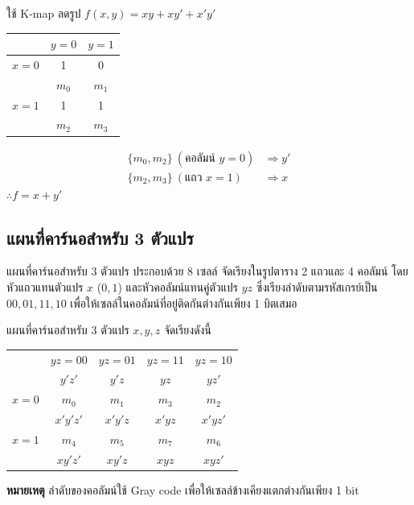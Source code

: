 \begin{ex}
\label{ex:kmap-2var-b}
ใช้ K-map ลดรูป $f(x, y) = x y + x y' + x' y'$

\begin{center}
\begin{tabular}{|c|c|c|}
\hline
 & $y = 0$ & $y = 1$ \\
\hline
$x = 0$ & 1 & 0 \\
       & $m_0$ & $m_1$ \\
\hline
$x = 1$ & 1 & 1 \\
       & $m_2$ & $m_3$ \\
\hline
\end{tabular}
\end{center}
\end{ex}
\begin{solution}
\begin{align*}
\{m_0, m_2\}\ (\text{คอลัมน์ } y = 0) &\Rightarrow y'\\
\{m_2, m_3\}\ (\text{แถว } x = 1) &\Rightarrow x
\end{align*}
$\therefore f = x + y'$ \solhere
\end{solution}

\subsection{แผนที่คาร์นอสำหรับ 3 ตัวแปร}
แผนที่คาร์นอสำหรับ 3 ตัวแปร ประกอบด้วย 8 เซลล์ จัดเรียงในรูปตาราง 2 แถวและ 4 คอลัมน์ โดยหัวแถวแทนตัวแปร $x$ ($0, 1$) และหัวคอลัมน์แทนคู่ตัวแปร $yz$ ซึ่งเรียงลำดับตามรหัสเกรย์เป็น $00, 01, 11, 10$ เพื่อให้เซลล์ในคอลัมน์ที่อยู่ติดกันต่างกันเพียง 1 บิตเสมอ~\parencite{wakerly2018digital}

\begin{principle}
แผนที่คาร์นอสำหรับ 3 ตัวแปร $x, y, z$ จัดเรียงดังนี้

\begin{center}
\begin{tabular}{|c|c|c|c|c|}
\hline
 & $yz = 00$ & $yz = 01$ & $yz = 11$ & $yz = 10$ \\
 & $y'z'$ & $y'z$ & $yz$ & $yz'$ \\
\hline
$x = 0$ & $m_0$ & $m_1$ & $m_3$ & $m_2$ \\
       & $x'y'z'$ & $x'y'z$ & $x'yz$ & $x'yz'$ \\
\hline
$x = 1$ & $m_4$ & $m_5$ & $m_7$ & $m_6$ \\
       & $xy'z'$ & $xy'z$ & $xyz$ & $xy z'$ \\
\hline
\end{tabular}
\end{center}

\textbf{หมายเหตุ} ลำดับของคอลัมน์ใช้ Gray code เพื่อให้เซลล์ข้างเคียงแตกต่างกันเพียง 1 bit
\end{principle}

